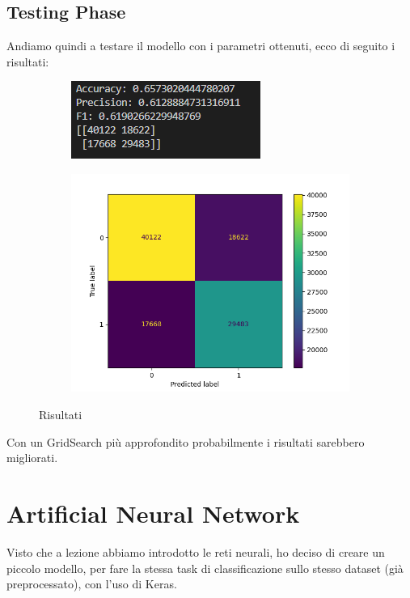 \documentclass{article}
\begin{document}
\subsection{Testing Phase}
Andiamo quindi a testare il modello con i parametri ottenuti, ecco di seguito i risultati:
\begin{figure}[H]
 \centering
  \begin{subfigure}[b]{0.7\linewidth}
    \includegraphics[width=\linewidth]{TestScores}
     \caption{}
  \end{subfigure}
  \begin{subfigure}[b]{0.7\linewidth}
    \includegraphics[width=\linewidth]{ConfusionMatrix}
     \caption{}
  \end{subfigure}
  \caption{Risultati}
  \label{fig:image6}
\end{figure}

Con un GridSearch più approfondito probabilmente i risultati sarebbero migliorati.

\section{Artificial Neural Network}
Visto che a lezione abbiamo introdotto le reti neurali, ho deciso di creare un piccolo modello, per fare la stessa task di classificazione sullo stesso dataset (già preprocessato), con l'uso di Keras.
\end{document}
